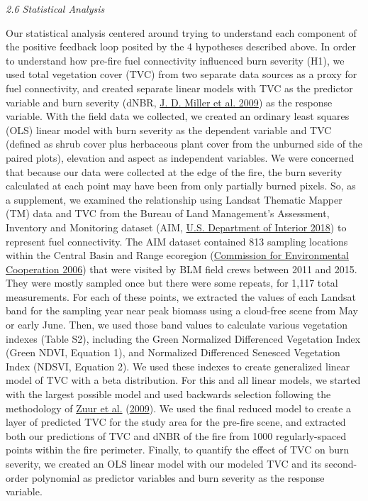 \documentclass[
  12pt,
]{article}
\begin{document}
\emph{2.6 Statistical Analysis}

Our statistical analysis centered around trying to understand each
component of the positive feedback loop posited by the 4 hypotheses
described above. In order to understand how pre-fire fuel connectivity
influenced burn severity (H1), we used total vegetation cover (TVC) from
two separate data sources as a proxy for fuel connectivity, and created
separate linear models with TVC as the predictor variable and burn
severity (dNBR, \protect\hyperlink{ref-Miller2009}{J. D. Miller et al.
2009}) as the response variable. With the field data we collected, we
created an ordinary least squares (OLS) linear model with burn severity
as the dependent variable and TVC (defined as shrub cover plus
herbaceous plant cover from the unburned side of the paired plots),
elevation and aspect as independent variables. We were concerned that
because our data were collected at the edge of the fire, the burn
severity calculated at each point may have been from only partially
burned pixels. So, as a supplement, we examined the relationship using
Landsat Thematic Mapper (TM) data and TVC from the Bureau of Land
Management's Assessment, Inventory and Monitoring dataset (AIM,
\protect\hyperlink{ref-AIM}{U.S. Department of Interior 2018}) to
represent fuel connectivity. The AIM dataset contained 813 sampling
locations within the Central Basin and Range ecoregion
(\protect\hyperlink{ref-CEC2006}{Commission for Environmental
Cooperation 2006}) that were visited by BLM field crews between 2011 and
2015. They were mostly sampled once but there were some repeats, for
1,117 total measurements. For each of these points, we extracted the
values of each Landsat band for the sampling year near peak biomass
using a cloud-free scene from May or early June. Then, we used those
band values to calculate various vegetation indexes (Table S2),
including the Green Normalized Differenced Vegetation Index (Green NDVI,
Equation 1), and Normalized Differenced Senesced Vegetation Index
(NDSVI, Equation 2). We used these indexes to create generalized linear
model of TVC with a beta distribution. For this and all linear models,
we started with the largest possible model and used backwards selection
following the methodology of \protect\hyperlink{ref-Zuur2009}{Zuur et
al.} (\protect\hyperlink{ref-Zuur2009}{2009}). We used the final reduced
model to create a layer of predicted TVC for the study area for the
pre-fire scene, and extracted both our predictions of TVC and dNBR of
the fire from 1000 regularly-spaced points within the fire perimeter.
Finally, to quantify the effect of TVC on burn severity, we created an
OLS linear model with our modeled TVC and its second-order polynomial as
predictor variables and burn severity as the response variable.
\end{document}
